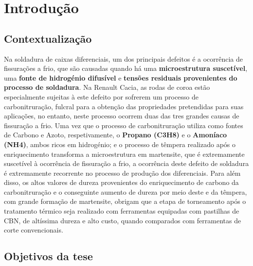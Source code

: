 \chapter{Introdução} \label{ch:intro}
\setlength{\headheight}{13.6pt}

\section{Contextualização} \label{s:intro_contextualizacao}

Na soldadura de caixas diferenciais, um dos principais defeitos é a ocorrência de fissurações a frio, que são causadas quando há uma \textbf{microestrutura suscetível}, uma \textbf{fonte de hidrogénio difusível} e \textbf{tensões residuais provenientes do processo de soldadura}. Na Renault Cacia, as rodas de coroa estão especialmente sujeitas à este defeito por sofrerem um processo de carbonitruração, fulcral para a obtenção das propriedades pretendidas para suas aplicações, no entanto, neste processo ocorrem duas das tres grandes causas de fissuração a frio. Uma vez que o processo de carbonitruração utiliza como fontes de Carbono e Azoto, respetivamente, o \textbf{Propano (C3H8)} e o \textbf{Amoníaco (NH4)}, ambos ricos em hidrogénio; e o processo de têmpera realizado após o enriquecimento transforma a microestrutura em martensite, que é extremamente suscetível à ocorrência de fissuração a frio, a ocorrência deste defeito de soldadura é extremamente recorrente no processo de produção dos diferenciais.
Para além disso, os altos valores de dureza provenientes do enriquecimento de carbono da carbonitruração e o conseguinte aumento de dureza por meio deste e da têmpera, com grande formação de martensite, obrigam que a etapa de torneamento após o tratamento térmico seja realizado com ferramentas equipadas com pastilhas de CBN, de altíssima dureza e alto custo, quando comparados com ferramentas de corte convencionais.
\section{Objetivos da tese} \label{s:intro_objetivos}

